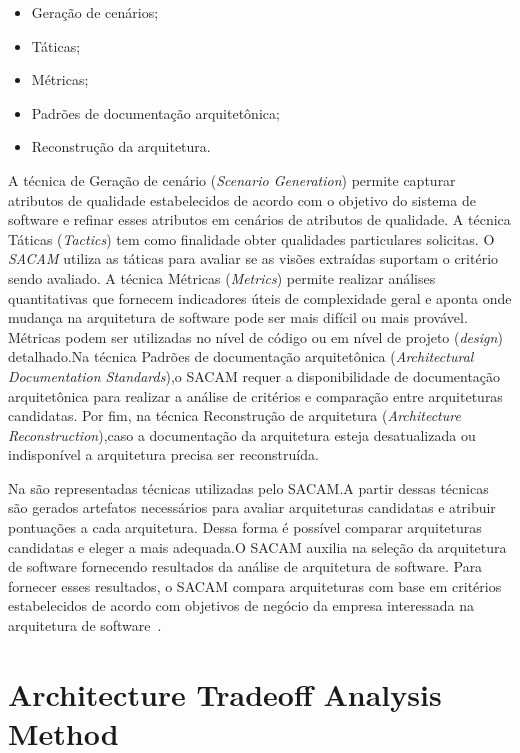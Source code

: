 \begin{itemize}
    \item Geração de cenários;
    \item Táticas;
    \item Métricas;
    \item Padrões de documentação arquitetônica;
    \item Reconstrução da arquitetura.
\end{itemize}

A técnica de Geração de cenário (\emph{Scenario Generation}) permite capturar atributos de qualidade estabelecidos de acordo com o objetivo do sistema de software  e refinar esses atributos em cenários de atributos de qualidade. A técnica Táticas (\emph{Tactics}) tem como finalidade  obter qualidades particulares solicitas.
O \emph{\acrfull{SACAM}} utiliza as táticas para avaliar se as visões extraídas suportam o critério sendo avaliado.
A técnica Métricas (\emph{Metrics}) permite realizar análises quantitativas que fornecem indicadores úteis de complexidade geral e aponta onde  mudança na arquitetura de software pode ser mais difícil ou mais provável. 
Métricas podem ser utilizadas no nível de código ou em  nível de projeto (\emph{design}) detalhado.Na técnica Padrões de documentação arquitetônica (\emph{Architectural Documentation Standards}),o SACAM requer a disponibilidade de documentação arquitetônica para realizar a análise de critérios e comparação entre arquiteturas candidatas. Por fim, na técnica Reconstrução de arquitetura (\emph{Architecture Reconstruction}),caso a documentação da arquitetura esteja desatualizada ou indisponível a arquitetura precisa ser reconstruída. 

%

Na  são representadas técnicas utilizadas pelo SACAM.A partir dessas técnicas são gerados artefatos necessários para avaliar arquiteturas candidatas e atribuir pontuações a cada arquitetura. Dessa forma é possível comparar arquiteturas candidatas e eleger a mais adequada.O SACAM auxilia na seleção da arquitetura de software fornecendo resultados da análise de arquitetura de software. Para fornecer esses resultados, o SACAM compara arquiteturas com base em critérios estabelecidos de acordo com objetivos de negócio da empresa interessada na arquitetura de software~\cite{SACAM}. 

\section{Architecture Tradeoff Analysis Method}

